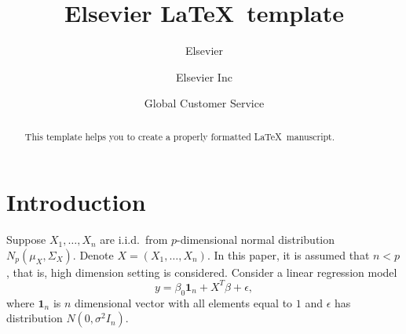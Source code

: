 \documentclass[review]{elsarticle}
\theoremstyle{plain}
\theoremstyle{definition}
\theoremstyle{remark}
\begin{document}
\begin{frontmatter}

\title{Elsevier \LaTeX\ template}

\author{Elsevier}
\address{Radarweg 29, Amsterdam}

\author[mymainaddress,mysecondaryaddress]{Elsevier Inc}

\author[mysecondaryaddress]{Global Customer Service}

\address[mymainaddress]{1600 John F Kennedy Boulevard, Philadelphia}
\address[mysecondaryaddress]{360 Park Avenue South, New York}

\begin{abstract}
This template helps you to create a properly formatted \LaTeX\ manuscript.
\end{abstract}

\begin{keyword}
\end{keyword}

\end{frontmatter}


\section{Introduction}
Suppose $X_1,\ldots,X_n$ are i.i.d.\ from $p$-dimensional normal distribution $N_{p}(\mu_X,\Sigma_X)$. 
Denote $X=(X_1,\ldots,X_n)$.
In this paper, it is assumed that $n<p$, that is, high dimension setting is considered.
Consider a linear regression model 
\begin{equation}\label{regModel}
    y=\beta_0 \textbf{1}_n+X^T \beta+\epsilon,
\end{equation}
     where $\textbf{1}_n$ is $n$ dimensional vector with all elements equal to $1$ and $\epsilon$ has distribution $N(0,\sigma^2 I_n)$.
\end{document}
